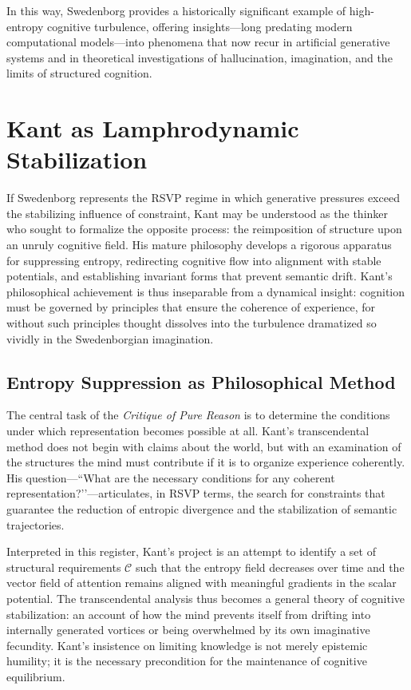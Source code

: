 \documentclass[12pt]{article}
\begin{document}
In this way, Swedenborg provides a historically significant example of 
high-entropy cognitive turbulence, offering insights—long predating modern 
computational models—into phenomena that now recur in artificial generative 
systems and in theoretical investigations of hallucination, imagination, and the 
limits of structured cognition.


\newpage
\section{Kant as Lamphrodynamic Stabilization}

If Swedenborg represents the RSVP regime in which generative pressures exceed 
the stabilizing influence of constraint, Kant may be understood as the thinker 
who sought to formalize the opposite process: the reimposition of structure 
upon an unruly cognitive field. His mature philosophy develops a rigorous 
apparatus for suppressing entropy, redirecting cognitive flow into alignment 
with stable potentials, and establishing invariant forms that prevent 
semantic drift. Kant’s philosophical achievement is thus inseparable from a 
dynamical insight: cognition must be governed by principles that ensure the 
coherence of experience, for without such principles thought dissolves into 
the turbulence dramatized so vividly in the Swedenborgian imagination.

\subsection{Entropy Suppression as Philosophical Method}

The central task of the \emph{Critique of Pure Reason} is to determine the 
conditions under which representation becomes possible at all. Kant’s 
transcendental method does not begin with claims about the world, but with an 
examination of the structures the mind must contribute if it is to organize 
experience coherently. His question—``What are the necessary conditions for any 
coherent representation?’’—articulates, in RSVP terms, the search for 
constraints that guarantee the reduction of entropic divergence and the 
stabilization of semantic trajectories. 

Interpreted in this register, Kant’s project is an attempt to identify a set of 
structural requirements $\mathcal{C}$ such that the entropy field decreases 
over time and the vector field of attention remains aligned with meaningful 
gradients in the scalar potential. The transcendental analysis thus becomes a 
general theory of cognitive stabilization: an account of how the mind prevents 
itself from drifting into internally generated vortices or being overwhelmed by 
its own imaginative fecundity. Kant’s insistence on limiting knowledge is not 
merely epistemic humility; it is the necessary precondition for the 
maintenance of cognitive equilibrium.
\end{document}
